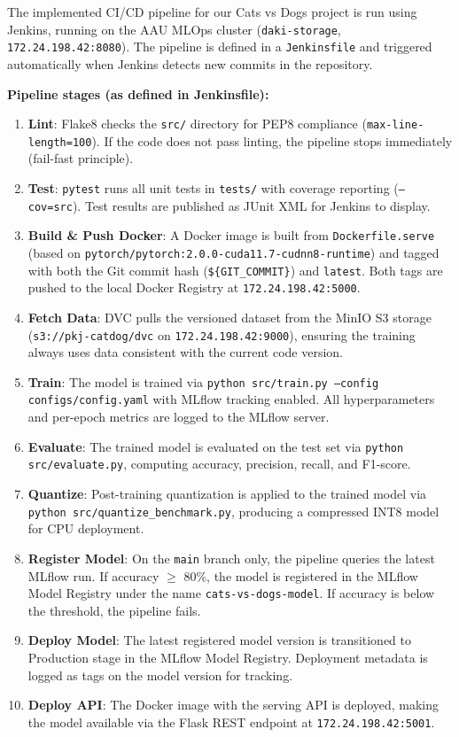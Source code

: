 \documentclass[10pt,twocolumn,letterpaper]{article}
\begin{document}
The implemented CI/CD pipeline for our Cats vs Dogs project is run using Jenkins, running on the AAU MLOps cluster (\texttt{daki-storage}, \texttt{172.24.198.42:8080}). The pipeline is defined in a \texttt{Jenkinsfile} and triggered automatically when Jenkins detects new commits in the repository.

\textbf{Pipeline stages (as defined in Jenkinsfile):}
\begin{enumerate}
    \item \textbf{Lint}: Flake8 checks the \texttt{src/} directory for PEP8 compliance (\texttt{max-line-length=100}). If the code does not pass linting, the pipeline stops immediately (fail-fast principle).
    \item \textbf{Test}: \texttt{pytest} runs all unit tests in \texttt{tests/} with coverage reporting (\texttt{--cov=src}). Test results are published as JUnit XML for Jenkins to display.
    \item \textbf{Build \& Push Docker}: A Docker image is built from \texttt{Dockerfile.serve} (based on \texttt{pytorch/pytorch:2.0.0-cuda11.7-cudnn8-runtime}) and tagged with both the Git commit hash (\texttt{\$\{GIT\_COMMIT\}}) and \texttt{latest}. Both tags are pushed to the local Docker Registry at \texttt{172.24.198.42:5000}.
    \item \textbf{Fetch Data}: DVC pulls the versioned dataset from the MinIO S3 storage (\texttt{s3://pkj-catdog/dvc} on \texttt{172.24.198.42:9000}), ensuring the training always uses data consistent with the current code version.
    \item \textbf{Train}: The model is trained via \texttt{python src/train.py --config configs/config.yaml} with MLflow tracking enabled. All hyperparameters and per-epoch metrics are logged to the MLflow server.
    \item \textbf{Evaluate}: The trained model is evaluated on the test set via \texttt{python src/evaluate.py}, computing accuracy, precision, recall, and F1-score.
    \item \textbf{Quantize}: Post-training quantization is applied to the trained model via \texttt{python src/quantize\_benchmark.py}, producing a compressed INT8 model for CPU deployment.
    \item \textbf{Register Model}: On the \texttt{main} branch only, the pipeline queries the latest MLflow run. If accuracy $\geq$ 80\%, the model is registered in the MLflow Model Registry under the name \texttt{cats-vs-dogs-model}. If accuracy is below the threshold, the pipeline fails.
    \item \textbf{Deploy Model}: The latest registered model version is transitioned to Production stage in the MLflow Model Registry. Deployment metadata is logged as tags on the model version for tracking.
    \item \textbf{Deploy API}: The Docker image with the serving API is deployed, making the model available via the Flask REST endpoint at \texttt{172.24.198.42:5001}.
\end{enumerate}
\end{document}
